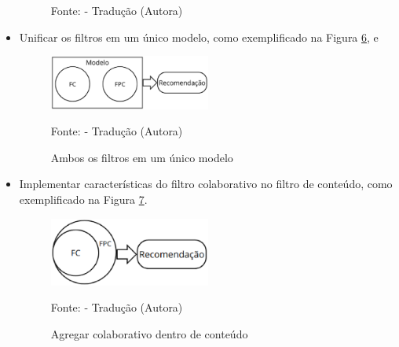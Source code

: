 \begin{itemize}
\begin{figure}[H]
        \vspace{2pt} %
        
        \small Fonte: \cite{thorat2015survey} - Tradução (Autora)
    \end{figure}

    \item Unificar os filtros em um único modelo, como exemplificado na Figura
    \hyperref[fig:modelounico]{6}, e

    \begin{figure}[H]
        \centering
        \caption{Ambos os filtros em um único modelo}
        \label{fig:modelounico}
        
        \vspace{2pt} %
        
        \includegraphics[width=0.5\textwidth]{figuras/modelounico2.eps}
        
        \vspace{2pt} %
        
        \small Fonte: \cite{thorat2015survey} - Tradução (Autora)
    \end{figure}

    \item Implementar características do filtro colaborativo no filtro de conteúdo, como exemplificado na Figura
    \hyperref[fig:cbfcf]{7}.

    \begin{figure}[H]
        \centering
        \caption{Agregar colaborativo dentro de conteúdo}
        \label{fig:cbfcf}
        
        \vspace{2pt} %
        
        \includegraphics[width=0.5\textwidth]{figuras/cbfcf2.eps}
        
        \vspace{2pt} %
        
        \small Fonte: \cite{thorat2015survey} - Tradução (Autora)
    \end{figure}
\end{itemize}

